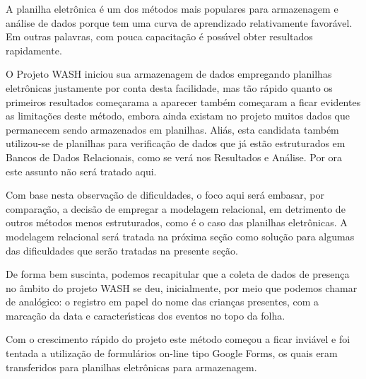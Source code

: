 \documentclass[
12pt,		%
openright,	%
twoside,  %
a4paper,			%
chapter=TITLE,		%
english,			%
french,				%
spanish,			%
brazil				%
]{USPSC-classe/USPSC_RedarTex}
\begin{document}
A planilha eletr\^onica \'e um dos m\'etodos mais populares para armazenagem e an\'alise de dados porque tem uma curva de aprendizado relativamente favor\'avel. Em outras palavras, com pouca capacita\c{c}\~ao \'e poss\'{\i}vel obter resultados rapidamente.








O Projeto WASH iniciou sua armazenagem de dados empregando planilhas eletr\^onicas justamente por conta desta facilidade, mas t\~ao r\'apido quanto os primeiros resultados come\c{c}arama a aparecer tamb\'em come\c{c}aram a ficar evidentes as limita\c{c}\~oes deste m\'etodo, embora ainda existam no projeto muitos dados que permanecem sendo armazenados em planilhas. Ali\'as, esta candidata tamb\'em utilizou-se de planilhas para verifica\c{c}\~ao de dados que j\'a est\~ao estruturados em Bancos de Dados Relacionais, como se ver\'a nos Resultados e An\'alise. Por ora este assunto n\~ao ser\'a tratado aqui.








Com base nesta observa\c{c}\~ao de dificuldades, o foco aqui ser\'a embasar, por compara\c{c}\~ao, a decis\~ao de empregar a modelagem relacional, em detrimento de outros m\'etodos menos estruturados, como \'e o caso das planilhas eletr\^onicas. A modelagem relacional ser\'a tratada na pr\'oxima se\c{c}\~ao como solu\c{c}\~ao para algumas das dificuldades que ser\~ao tratadas na presente se\c{c}\~ao.








De forma bem suscinta, podemos recapitular que a coleta de dados de presen\c{c}a no \^ambito do projeto WASH se deu, inicialmente, por meio que podemos chamar de anal\'ogico: o registro em papel do nome das crian\c{c}as presentes, com a marca\c{c}\~ao da data e caracter\'{\i}sticas dos eventos no topo da folha.








Com o crescimento r\'apido do projeto este m\'etodo come\c{c}ou a ficar invi\'avel e foi tentada a utiliza\c{c}\~ao de formul\'arios on-line tipo \textquotedbl Google Forms\textquotedbl , os quais eram transferidos para planilhas eletr\^onicas para armazenagem.
\end{document}
